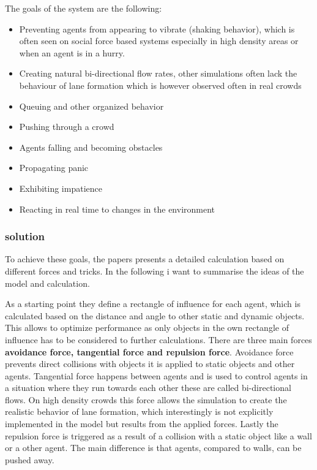 \documentclass[sigconf]{acmart}
\begin{document}
The goals of the system are the following:
\begin{itemize}
    \item Preventing agents from appearing to vibrate (shaking behavior), which is often seen on social force based systems especially in high density areas or when an agent is in a hurry.
    \item Creating natural bi-directional flow rates, other simulations often lack the behaviour of lane formation which is however observed often in real crowds
    \item Queuing and other organized behavior
    \item Pushing through a crowd
    \item Agents falling and becoming obstacles 
    \item Propagating panic
    \item Exhibiting impatience
    \item Reacting in real time to changes in the environment
\end{itemize}

\subsubsection{solution}
To achieve these goals, the papers presents a detailed calculation based on different forces and tricks. In the following i want to summarise the ideas of the model and calculation. 

As a starting point they define a rectangle of influence for each agent, which is calculated based on the distance and angle to other static and dynamic objects. This allows to optimize performance as only objects in the own rectangle of influence has to be considered to further calculations. 
There are three main forces \textbf{avoidance force, tangential force and repulsion force}. Avoidance force prevents direct collisions with objects it is applied to static objects and other agents. Tangential force happens between agents and is used to control agents in a situation where they run towards each other these are called bi-directional flows. On high density crowds this force allows the simulation to create the realistic behavior of lane formation, which interestingly is not explicitly implemented in the model but results from the applied forces. Lastly the repulsion force is triggered as a result of a collision with a static object like a wall or a other agent. The main difference is that agents, compared to walls, can be pushed away. 
\end{document}
